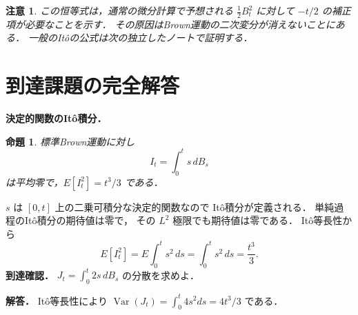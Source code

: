 \documentclass[a5paper,10pt,onecolumn]{jsarticle}
\makeatletter
\theoremstyle{mathnotetheorem}
\newtheorem{proposition}[theorem]{命題}
\newtheorem{remark}[theorem]{注意}
\renewcommand{\proofname}{証明}
\renewenvironment{proof}[1][\proofname]{%
  \par\pushQED{\qed}\normalfont\topsep4\p@\@plus2\p@\relax
  \trivlist\item[\hskip\labelsep\bfseries #1]\ignorespaces
}{\popQED\endtrivlist\@endpefalse}
\makeatother
\begin{document}
\begin{remark}
この恒等式は，通常の微分計算で予想される
$\frac12B_t^2$ に対して $-t/2$ の補正項が必要なことを示す．
その原因はBrown運動の二次変分が消えないことにある．
一般のIt\^oの公式は次の独立したノートで証明する．
\end{remark}

\section{到達課題の完全解答}
\noindent\textbf{決定的関数のItô積分．}
\begin{proposition}
標準Brown運動に対し
\[
I_t=\int_0^t s\,dB_s
\]
は平均零で，$E[I_t^2]=t^3/3$ である．
\end{proposition}
\begin{proof}
$s$ は $[0,t]$ 上の二乗可積分な決定的関数なので
Itô積分が定義される．
単純過程のItô積分の期待値は零で，
その $L^2$ 極限でも期待値は零である．
Itô等長性から
\[
E[I_t^2]
=E\int_0^t s^2\,ds
=\int_0^t s^2\,ds=\frac{t^3}{3}.
\]
\end{proof}
\noindent\textbf{到達確認．}
$J_t=\int_0^t 2s\,dB_s$ の分散を求めよ．
\par\noindent\textbf{解答．}
Itô等長性により
$\operatorname{Var}(J_t)=\int_0^t4s^2ds
=4t^3/3$ である．
\end{document}
